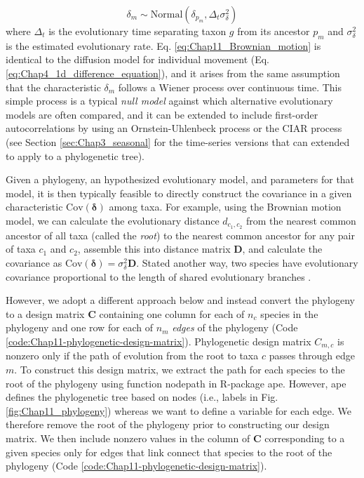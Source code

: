 \begin{equation} \label{eq:Chap11_Brownian_motion}
    \delta_m \sim \mathrm{Normal}( \delta_{p_m}, \Delta_t \sigma_{\delta}^2 )
\end{equation}
where \( \Delta_t \) is the evolutionary time separating taxon \(g\) from its ancestor \(p_m\) and \( \sigma_{\delta}^2 \) is the estimated evolutionary rate. Eq. \ref{eq:Chap11_Brownian_motion} is identical to the diffusion model for individual movement (Eq. \ref{eq:Chap4_1d_difference_equation}), and it arises from the same assumption that the characteristic \(\delta_m\) follows a Wiener process over continuous time.  This simple process is a typical \textit{null model} against which alternative evolutionary models are often compared, and it can be extended to include first-order autocorrelations by using an Ornstein-Uhlenbeck process or the CIAR process (see Section \ref{sec:Chap3_seasonal} for the time-series versions that can extended to apply to a phylogenetic tree).

Given a phylogeny, an hypothesized evolutionary model, and parameters for that model, it is then typically feasible to directly construct the covariance in a given characteristic \(\mathrm{Cov}(\mathbf{\delta})\) among taxa.  For example, using the Brownian motion model, we can calculate the evolutionary distance \( d_{c_1,c_2} \) from the nearest common ancestor of all taxa (called the \textit{root}) to the nearest common ancestor for any pair of taxa \(c_1\) and \(c_2\), assemble this into distance matrix \(\mathbf{D}\), and calculate the covariance as \( \mathrm{Cov}(\mathbf{\delta}) = \sigma_{\delta}^2 \mathbf{D} \).  Stated another way, two species have evolutionary covariance proportional to the length of shared evolutionary branches \cite{harmon_phylogenetic_2018}.   

However, we adopt a different approach below and instead convert the phylogeny to a design matrix \( \mathbf{C} \) containing one column for each of \(n_c\) species in the phylogeny and one row for each of \(n_m\) \textit{edges} of the phylogeny (Code \ref{code:Chap11-phylogenetic-design-matrix}).  Phylogenetic design matrix \(C_{m,c}\) is nonzero only if the path of evolution from the root to taxa \(c\) passes through edge \(m\).  To construct this design matrix, we extract the path for each species to the root of the phylogeny using function \colorbox{backcolour}{nodepath} in R-package \colorbox{backcolour}{ape}\cite{paradis_ape_2019}. However, \colorbox{backcolour}{ape} defines the phylogenetic tree based on nodes (i.e., labels in Fig. \ref{fig:Chap11_phylogeny}) whereas we want to define a variable for each edge.  We therefore remove the root of the phylogeny prior to constructing our design matrix.  We then include nonzero values in the column of \(\mathbf{C}\) corresponding to a given species only for edges that link connect that species to the root of the phylogeny (Code \ref{code:Chap11-phylogenetic-design-matrix}).  

